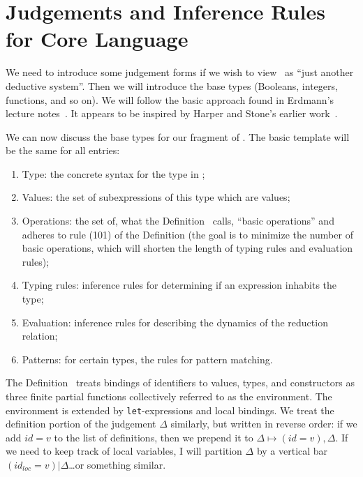 \section{Judgements and Inference Rules for Core Language}
\begin{node}\label{sml-0003}%
We need to introduce some judgement forms if we wish to view \SML\ as
``just another deductive system''. Then we will introduce the base types
(Booleans, integers, functions, and so on). We will follow the basic
approach found in Erdmann's lecture notes~\cite{erdmann2023evaluation}.
It appears to be inspired by Harper and Stone's earlier work~\cite{harper2000:smltt-final}.
\end{node}



\begin{node}\label{sml:core-0004}%
\begin{node}\label{sml-000D}%
We can now discuss the base types for our fragment of \SML. The basic
template will be the same for all entries:
\begin{enumerate}
\item Type: the concrete syntax for the type in \SML;
\item Values: the set of subexpressions of this type which are values;
\item Operations: the set of, what the Definition~\cite{milner1997definition}
  calls, ``basic operations'' and adheres to rule (101) of the
  Definition (the goal is to minimize the number of basic operations,
  which will shorten the length of typing rules and evaluation rules);
\item Typing rules: inference rules for determining if an expression
  inhabits the type;
\item Evaluation: inference rules for describing the dynamics of the
  reduction relation;
\item Patterns: for certain types, the rules for pattern matching.
\end{enumerate}
\end{node}

\end{node}


\begin{node}\label{sml:core-0000}%
The Definition~\cite{milner1997definition} treats bindings of
identifiers to values, types, and constructors as three finite partial
functions collectively referred to as the environment. The environment
is extended by \texttt{let}-expressions and local bindings. We treat the
definition portion of the judgement $\Delta$ similarly, but written in
reverse order: if we add $id=v$ to the list of definitions, then we
prepend it to $\Delta\mapsto(id=v),\Delta$. If we need to keep track of
local variables, I will partition $\Delta$ by a vertical bar
$(id_{loc}=v)|\Delta$\dots or something similar. 
\end{node}

